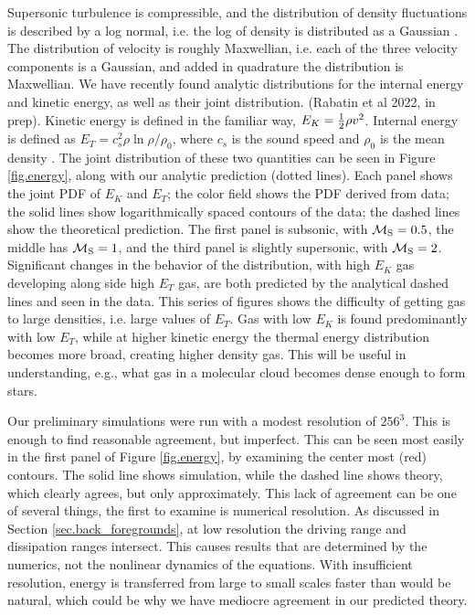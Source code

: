 Supersonic turbulence is compressible, and the distribution of density
fluctuations is described by a log normal, i.e. the log of density is
distributed as a Gaussian \citep{Vazquez-Semadeni94}.  The distribution of velocity is roughly Maxwellian,
i.e. each of the three velocity components is a Gaussian, and added in quadrature the
distribution is Maxwellian.  
We have recently found analytic distributions for the internal energy and
kinetic energy, as well as their joint
distribution.   (Rabatin et al 2022, in prep). Kinetic energy is defined in the familiar way, $E_K=\frac{1}{2} \rho
v^2$.  Internal energy is defined as $E_T= c_s^2 \rho \ln \rho/\rho_0$, where
$c_s$ is the sound speed and $\rho_0$ is the mean density \citep{Banerjee18}.  The joint
distribution of these two quantities can be seen in Figure \ref{fig.energy},
along with our analytic prediction (dotted lines).
Each panel shows the joint PDF of $E_K$ and $E_T$;  the color field shows the
PDF derived from data; the solid lines show logarithmically spaced contours of
the data; the dashed lines show the theoretical prediction.  The first panel is
subsonic, with $\mathcal{M_{\rm{S}}}=0.5$, the middle has $\mathcal{M_{\rm{S}}}=1$, and the third panel is
slightly supersonic, with $\mathcal{M_{\rm{S}}}=2$.  Significant changes in the behavior of the
distribution, with high $E_K$ gas developing along side high $E_T$ gas, are both
predicted by the analytical dashed lines and seen in the data.  This series of
figures shows the difficulty of getting gas to large densities, i.e. large
values of $E_T$.  Gas with low $E_K$ is found predominantly with low $E_T$,
while at higher kinetic energy the thermal energy distribution becomes more
broad, creating higher density gas.  This will be useful in understanding, e.g.,
what gas in a molecular cloud becomes dense enough to form stars.

Our preliminary simulations were run with a modest resolution of $256^3$.  This
is enough to find reasonable agreement, but imperfect. This can be seen most
easily in the first panel of Figure \ref{fig.energy}, by examining the center
most (red) contours. The solid line shows simulation, while the dashed line
shows theory, which clearly agrees, but only approximately.  This lack of
agreement can be one of several things, the first to examine is numerical
resolution.  As discussed in Section \ref{sec.back_foregrounds}, at low
resolution the driving range and dissipation ranges intersect.  This causes
results that are determined by the numerics, not the nonlinear dynamics of the
equations.  
With insufficient resolution, energy is transferred from large to
small scales faster than would be natural, which could be why we have mediocre
agreement in our predicted theory.  

